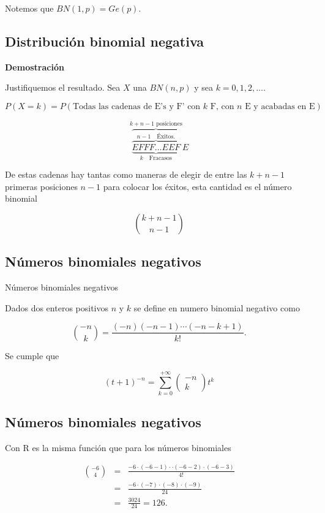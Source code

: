 \documentclass[]{book}
\begin{document}
Notemos que \(BN(1,p)=Ge(p)\).

\hypertarget{distribuciuxf3n-binomial-negativa-5}{%
\subsection{Distribución binomial negativa}\label{distribuciuxf3n-binomial-negativa-5}}

\textbf{Demostración}

Justifiquemos el resultado. Sea \(X\) una \(BN(n,p)\) y sea \(k=0,1,2,\ldots\).

\[P(X=k)=P(\mbox{Todas las cadenas de E's y F' con $k$ F, con $n$ E y acabadas en E})\]

\[
\overbrace{\underbrace{\overbrace{EFFF\ldots EEF}^{n-1 \quad \mbox{Éxitos}.}}}_{k \quad\mbox{Fracasos}}^{k+n-1\mbox{ posiciones}}E
\]

De estas cadenas hay tantas como maneras de elegir de entre las \(k+n-1\) primeras posiciones \(n-1\) para colocar los éxitos, esta cantidad es el número binomial

\[{k+n-1\choose n-1}\]

\hypertarget{nuxfameros-binomiales-negativos}{%
\subsection{Números binomiales negativos}\label{nuxfameros-binomiales-negativos}}

 Números binomiales negativos

Dados dos enteros positivos \(n\) y \(k\) se define en numero binomial negativo como

\[\binom{-n}{k}=\frac{(-n)(-n-1)\cdots (-n-k+1)}{k!}.\]

Se cumple que

\[
(t+1)^{-n}=\sum_{k=0}^{+\infty}\left(\begin{array}{c} -n
\\ k\end{array}\right) t^{k}
\]

\hypertarget{nuxfameros-binomiales-negativos-1}{%
\subsection{Números binomiales negativos}\label{nuxfameros-binomiales-negativos-1}}

Con R es la misma función que para los números binomiales

\[
\begin{eqnarray*}
{-6\choose 4}&=&\frac{-6\cdot (-6-1)\cdot \cdot (-6-2)\cdot (-6-3) }{4!}\\
&=&  \frac{-6\cdot(-7)\cdot (-8)\cdot (-9)}{24}\\
&=& \frac{3024}{24}=126.
\end{eqnarray*}
\]
\end{document}
